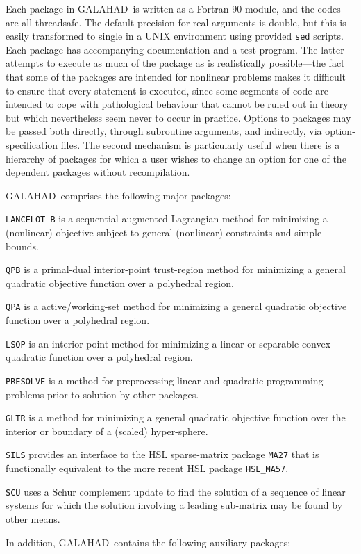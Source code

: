 \documentclass[twoside]{article}
\newcommand{\gal}{{\sf GALAHAD}}
\renewcommand{\itt}[1]{\item{{\tt #1}}}
\begin{document}
Each package in \gal\ is written as a Fortran 90 module, and the codes
are all threadsafe. The default
precision for real arguments is double, but this is easily transformed
to single in a UNIX environment using provided {\tt sed} scripts. 
Each package has accompanying
documentation and a test program. The latter attempts to execute as 
much of the package as
is realistically possible---the fact that some of the packages are
intended for nonlinear problems makes it difficult to ensure that
every statement is executed, since some segments of code are
intended to cope with pathological behaviour that cannot be ruled out
in theory but which nevertheless seem never to occur in practice.
Options to packages may be passed both directly, through subroutine arguments,
and indirectly, via option-specification files. The second mechanism is
particularly useful when there is a hierarchy of packages for which
a user wishes to change an option for one of the dependent packages without
recompilation.


\gal\ comprises the following major packages:

\begin{description}

\itt{LANCELOT B} is a sequential augmented Lagrangian method for 
minimizing a (nonlinear) objective subject to general (nonlinear) constraints
and simple bounds.

\itt{QPB} is a primal-dual interior-point trust-region method for 
minimizing a general quadratic objective function over a polyhedral region.

\itt{QPA} is a active/working-set method for 
minimizing a general quadratic objective function over a polyhedral region.

\itt{LSQP} is an interior-point method for minimizing a linear or 
separable convex quadratic function over a polyhedral region.

\itt{PRESOLVE} is a method for preprocessing linear and quadratic programming 
problems prior to solution by other packages.

\itt{GLTR} is a method for minimizing a general quadratic objective function 
over the interior or boundary of a (scaled) hyper-sphere.

\itt{SILS} provides an interface to the HSL sparse-matrix package {\tt MA27} 
that is functionally equivalent to the more recent HSL package {\tt HSL\_MA57}.

\itt{SCU} uses a Schur complement update to find the solution of 
a sequence of linear systems for which the solution
involving a leading sub-matrix may be found by other means.

\end{description}
In addition, \gal\ contains the following auxiliary packages:
\end{document}
